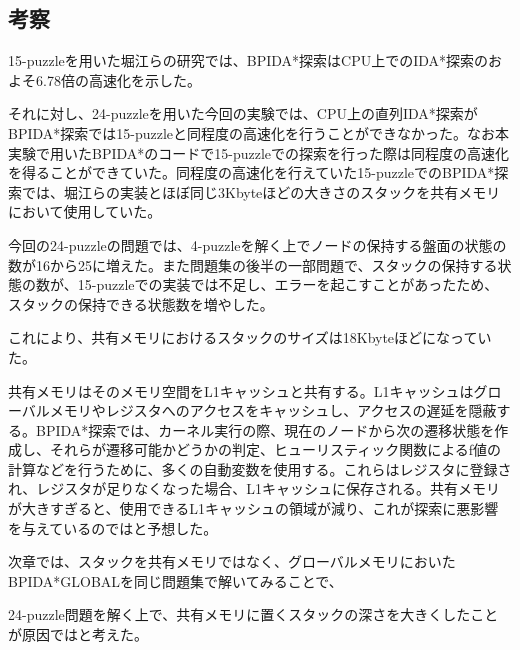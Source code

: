 \documentclass[a4paper,11pt,oneside,openany]{jsbook}
\begin{document}
\subsection{考察}
15-puzzleを用いた堀江らの研究では、BPIDA*探索はCPU上でのIDA*探索のおよそ6.78倍の高速化を示した。

それに対し、24-puzzleを用いた今回の実験では、CPU上の直列IDA*探索がBPIDA*探索では15-puzzleと同程度の高速化を行うことができなかった。なお本実験で用いたBPIDA*のコードで15-puzzleでの探索を行った際は同程度の高速化を得ることができていた。同程度の高速化を行えていた15-puzzleでのBPIDA*探索では、堀江らの実装とほぼ同じ3Kbyteほどの大きさのスタックを共有メモリにおいて使用していた。

今回の24-puzzleの問題では、4-puzzleを解く上でノードの保持する盤面の状態の数が16から25に増えた。また問題集の後半の一部問題で、スタックの保持する状態の数が、15-puzzleでの実装では不足し、エラーを起こすことがあったため、スタックの保持できる状態数を増やした。

これにより、共有メモリにおけるスタックのサイズは18Kbyteほどになっていた。

共有メモリはそのメモリ空間をL1キャッシュと共有する。L1キャッシュはグローバルメモリやレジスタへのアクセスをキャッシュし、アクセスの遅延を隠蔽する。BPIDA*探索では、カーネル実行の際、現在のノードから次の遷移状態を作成し、それらが遷移可能かどうかの判定、ヒューリスティック関数によるf値の計算などを行うために、多くの自動変数を使用する。これらはレジスタに登録され、レジスタが足りなくなった場合、L1キャッシュに保存される。共有メモリが大きすぎると、使用できるL1キャッシュの領域が減り、これが探索に悪影響を与えているのではと予想した。

次章では、スタックを共有メモリではなく、グローバルメモリにおいたBPIDA*GLOBALを同じ問題集で解いてみることで、





24-puzzle問題を解く上で、共有メモリに置くスタックの深さを大きくしたことが原因ではと考えた。


\end{document}
